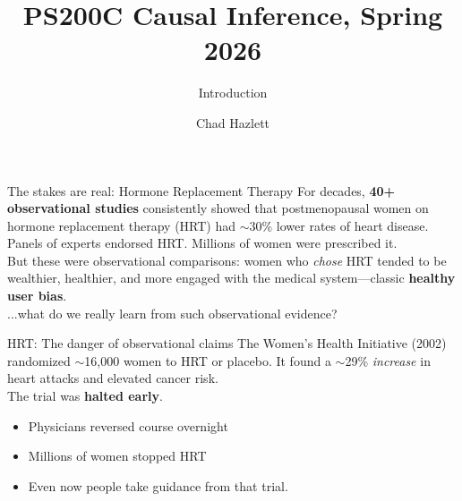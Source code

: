 \documentclass[handout,xcolor=dvipsnames,pdftex,hyperref={colorlinks=false}]{beamer}
\title[]{PS200C Causal Inference, Spring 2026}
\subtitle[ ]{Introduction}
\author[Hazlett]{Chad Hazlett }
\institute[UCLA]{UCLA\\[1ex]
  \texttt{chazlett@ucla.edu}
}
\date{}
\begin{document}
\subject{Talks}


\begin{frame}
  \titlepage
\end{frame}


\begin{frame}{The stakes are real: Hormone Replacement Therapy}
\small
{} For decades, \textbf{40+ observational studies} consistently showed that postmenopausal women on hormone replacement therapy (HRT) had $\sim$30\% lower rates of heart disease.\\
\bigskip
{} Panels of experts endorsed HRT. Millions of women were prescribed it.\\
\bigskip
{} But these were observational comparisons: women who \textit{chose} HRT tended to be wealthier, healthier, and more engaged with the medical system---classic \textbf{healthy user bias}.\\
\bigskip
{} ...what do we really learn from such observational evidence?
\end{frame}

\begin{frame}{HRT: The danger of observational claims}
 The Women's Health Initiative (2002) randomized $\sim$16,000 women to HRT or placebo. It found a $\sim$29\% \textit{increase} in heart attacks and elevated cancer risk.\\
\medskip
{} The trial was \textbf{halted early}. 
\begin{itemize}
\item Physicians reversed course overnight
\item  Millions of women stopped HRT
\item Even now people take guidance from that trial.
\end{itemize}
\end{frame}
\end{document}

